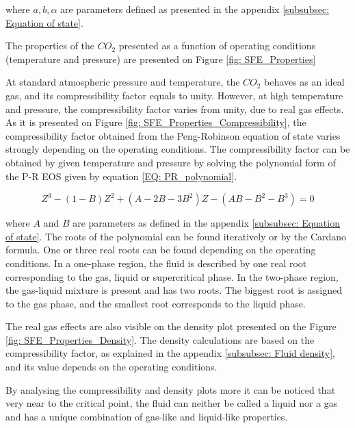 \documentclass[../Article_Design_of_Experiment.tex]{subfiles}
\begin{document}
    where $a, b, \alpha$ are parameters defined as presented in the appendix \ref{subsubsec: Equation of state}.
    
    The properties of the $CO_2$ presented as a function of operating conditions (temperature and pressure) are presented on Figure \ref{fig: SFE_Properties}    
    
    At standard atmospheric pressure and temperature, the $CO_2$ behaves as an ideal gas, and its compressibility factor equals to unity.  However, at high temperature and pressure, the compressibility factor varies from unity, due to real gas effects. As it is presented on Figure \ref{fig: SFE_Properties_Compressibility}, the compressibility factor obtained from the Peng-Robinson equation of state varies strongly depending on the operating conditions. The compressibility factor can be obtained by given temperature and pressure by solving the polynomial form of the P-R EOS given by equation \ref{EQ: PR_polynomial}.

    {\footnotesize
    \begin{equation}
        Z^3 - (1-B)Z^2+(A-2B-3B^2)Z -(AB-B^2-B^3) = 0
        \label{EQ: PR_polynomial}
    \end{equation}
    }

    where $A$ and $B$ are parameters as defined in the appendix \ref{subsubsec: Equation of state}. The roots of the polynomial can be found iteratively or by the Cardano formula. One or three real roots can be found depending on the operating conditions. In a one-phase region, the fluid is described by one real root corresponding to the gas, liquid or supercritical phase. In the two-phase region, the gas-liquid mixture is present and has two roots. The biggest root is assigned to the gas phase, and the smallest root corresponds to the liquid phase.

 	The real gas effects are also visible on the density plot presented on the Figure \ref{fig: SFE_Properties_Density}. The density calculations are based on the compressibility factor, as explained in the appendix \ref{subsubsec: Fluid density}, and its value depends on the operating conditions. 
    
    By analysing the compressibility and density plots more it can be noticed that very near to the critical point, the fluid can neither be called a liquid nor a gas and has a unique combination of gas-like and liquid-like properties. 
\end{document}
